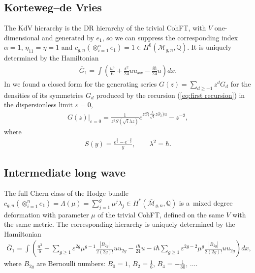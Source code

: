 \documentclass[pdftex]{sigma}
\numberwithin{equation}{section}
\newcommand{\oM}{\overline{\mathcal M}}
\def\mbQ{{\mathbb Q}}
\def\d{{\partial}}
\newcommand{\<}{\left<}
\renewcommand{\>}{\right>}
\newcommand{\eps}{\varepsilon}
\newcommand{\oG}{{\overline G}}
\begin{document}
\subsection{Korteweg--de Vries} The KdV hierarchy is the DR hierarchy of the trivial CohFT, with $V$ one-dimensional and generated by $e_1$, so we can suppress the corresponding index $\alpha=1$, $\eta_{11}=\eta=1$ and $c_{g,n}(\otimes_{i=1}^n e_1) = 1 \in H^0(\oM_{g,n},\mbQ)$. It is uniquely determined by the Hamiltonian \cite{BR15}
\begin{gather*}\oG_1=\int\left(\frac{u^3}{6}+\frac{\eps^2}{24}u u_{xx}-\frac{i\hbar}{24}u\right)dx.\end{gather*}
In \cite{BR15} we found a closed form for the generating series $G(z) = \sum\limits_{d\ge -1}z^d G_d$ for the densities of its symmetries $G_d$ produced by the recursion (\ref{eq:first recursion}) in the dispersionless limit $\eps=0$,
\begin{gather*}G(z)|_{\eps = 0}=\frac{1}{z^2S(\sqrt{i}\lambda z)}e^{zS\big(\frac{\lambda}{\sqrt{i}}z\d_x\big)u}-z^{-2},
\end{gather*}
where
\begin{gather*}
 S(y)=\frac{e^{\frac{y}{2}}-e^{-\frac{y}{2}}}{y},\qquad \lambda^2 =\hbar.
\end{gather*}

\subsection{Intermediate long wave} The full Chern class of the Hodge bundle $c_{g,n}(\otimes_{i=1}^n e_1) = \Lambda(\mu) = \sum\limits_{j=1}^g \mu^j \lambda_j \in H^*(\oM_{g,n},\mbQ)$ is a~mixed degree deformation with parameter $\mu$ of the trivial CohFT, def\/ined on the same $V$ with the same metric. The corresponding hierarchy is uniquely determined by the Hamiltonian~\cite{BR15}{\samepage
\begin{gather*}\oG_1=\int\left(\frac{u^3}{6}+\sum_{g\ge 1}\eps^{2g}\mu^{g-1}\frac{|B_{2g}|}{2(2g)!}uu_{2g}-\frac{i\hbar}{24}u-i\hbar\sum_{g\ge 1}\eps^{2g-2}\mu^g\frac{|B_{2g}|}{2(2g)!}uu_{2g}\right)dx,\end{gather*}
where $B_{2g}$ are Bernoulli numbers: $B_0=1$, $B_2=\frac{1}{6}$, $B_4=-\frac{1}{30}$, $\dots$.}
\end{document}
